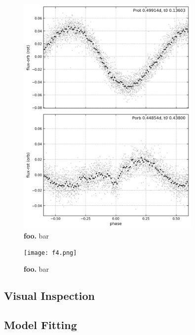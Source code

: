 \documentclass[12pt,twocolumn,tighten]{aastex62}
\begin{document}
\begin{figure}[t]
	\begin{center}
		\leavevmode
		\includegraphics[width=0.8\textwidth]{f3.png}
	\end{center}
	\vspace{-0.7cm}
	\caption{ {\bf foo.}
    bar
		\label{fig:phasefold}
	}
\end{figure}

\begin{figure}[t]
	\begin{center}
		\leavevmode
		\texttt{[image: f4.png]}
	\end{center}
	\vspace{-0.7cm}
	\caption{ {\bf foo.}
    bar
		\label{fig:corner}
	}
\end{figure}


\subsection{Visual Inspection}

% 

\subsection{Model Fitting}
\end{document}
